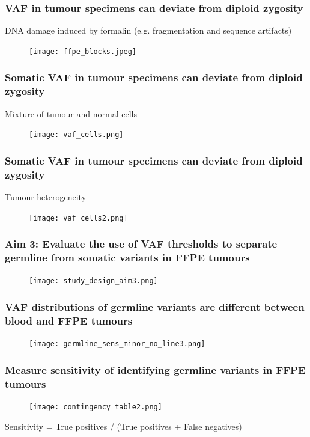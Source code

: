 \documentclass{beamer}
\begin{document}
\begin{frame}
\frametitle{VAF in tumour specimens can deviate from diploid zygosity}
DNA damage induced by formalin (e.g. fragmentation and sequence artifacts)
\begin{figure}[t]
    \texttt{[image: ffpe\_blocks.jpeg]}
\end{figure}
\end{frame}

\begin{frame}
\frametitle{Somatic VAF in tumour specimens can deviate from diploid zygosity}
Mixture of tumour and normal cells
\begin{figure}[t]
    \texttt{[image: vaf\_cells.png]}
\end{figure}
\end{frame}

\begin{frame}
\frametitle{Somatic VAF in tumour specimens can deviate from diploid zygosity}
Tumour heterogeneity
\begin{figure}[t]
    \texttt{[image: vaf\_cells2.png]}
\end{figure}
\end{frame}

\begin{frame}
\frametitle{Aim 3: Evaluate the use of VAF thresholds to separate germline from somatic variants in FFPE tumours}
\begin{figure}[t]
    \texttt{[image: study\_design\_aim3.png]}
\end{figure}
\end{frame}

\begin{frame}
\frametitle{VAF distributions of germline variants are different between blood and FFPE tumours}
\begin{figure}[t]
    \texttt{[image: germline\_sens\_minor\_no\_line3.png]}
\end{figure}
\end{frame}

\begin{frame}
\frametitle{Measure sensitivity of identifying germline variants in FFPE tumours}
\begin{figure}[t]
    \texttt{[image: contingency\_table2.png]}
\end{figure}
\vspace{-2mm}
\centering
Sensitivity = True positives / (True positives + False negatives)
\end{frame}
\end{document}
